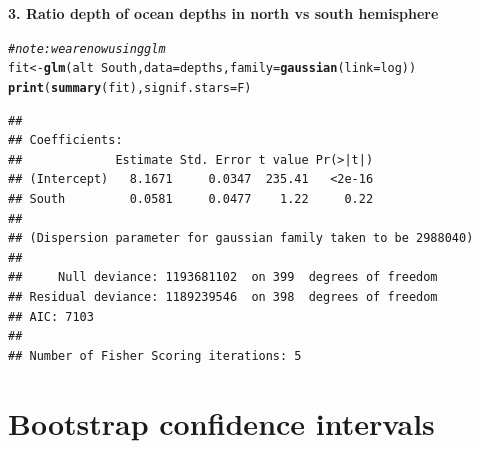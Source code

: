 \documentclass[10pt]{beamer}\usepackage[]{graphicx}\usepackage[]{color}
\makeatletter
\newcommand{\hlcom}[1]{\textcolor[rgb]{0.678,0.584,0.686}{\textit{#1}}}%
\newcommand{\hlopt}[1]{\textcolor[rgb]{0,0,0}{#1}}%
\newcommand{\hlstd}[1]{\textcolor[rgb]{0.345,0.345,0.345}{#1}}%
\newcommand{\hlkwb}[1]{\textcolor[rgb]{0.69,0.353,0.396}{#1}}%
\newcommand{\hlkwc}[1]{\textcolor[rgb]{0.333,0.667,0.333}{#1}}%
\newcommand{\hlkwd}[1]{\textcolor[rgb]{0.737,0.353,0.396}{\textbf{#1}}}%
\newenvironment{kframe}{%
 \def\at@end@of@kframe{}%
 \ifinner\ifhmode%
  \def\at@end@of@kframe{\end{minipage}}%
  \begin{minipage}{\columnwidth}%
 \fi\fi%
 \def\FrameCommand##1{\hskip\@totalleftmargin \hskip-\fboxsep
 \colorbox{shadecolor}{##1}\hskip-\fboxsep
     \hskip-\linewidth \hskip-\@totalleftmargin \hskip\columnwidth}%
 \MakeFramed {\advance\hsize-\width
   \@totalleftmargin\z@ \linewidth\hsize
   \@setminipage}}%
 {\par\unskip\endMakeFramed%
 \at@end@of@kframe}
\newenvironment{knitrout}{}{} %
\makeatother
\begin{document}
\begin{frame}
\vspace*{-1.1in}
\textbf{3. Ratio depth of ocean depths in north vs south hemisphere}
\begin{knitrout}\tiny
{}\color{fgcolor}\begin{kframe}
\begin{alltt}
\hlcom{# note: we are now using glm}
\hlstd{fit} \hlkwb{<-} \hlkwd{glm}\hlstd{(alt} \hlopt{~} \hlstd{South,} \hlkwc{data} \hlstd{= depths,} \hlkwc{family} \hlstd{=} \hlkwd{gaussian}\hlstd{(}\hlkwc{link}\hlstd{=log))}
\hlkwd{print}\hlstd{(}\hlkwd{summary}\hlstd{(fit),} \hlkwc{signif.stars} \hlstd{= F)}
\end{alltt}
\begin{verbatim}
## 
## Coefficients:
##             Estimate Std. Error t value Pr(>|t|)
## (Intercept)   8.1671     0.0347  235.41   <2e-16
## South         0.0581     0.0477    1.22     0.22
## 
## (Dispersion parameter for gaussian family taken to be 2988040)
## 
##     Null deviance: 1193681102  on 399  degrees of freedom
## Residual deviance: 1189239546  on 398  degrees of freedom
## AIC: 7103
## 
## Number of Fisher Scoring iterations: 5
\end{verbatim}
\end{kframe}
\end{knitrout}

\end{frame}


\section{Bootstrap confidence intervals}
\end{document}
